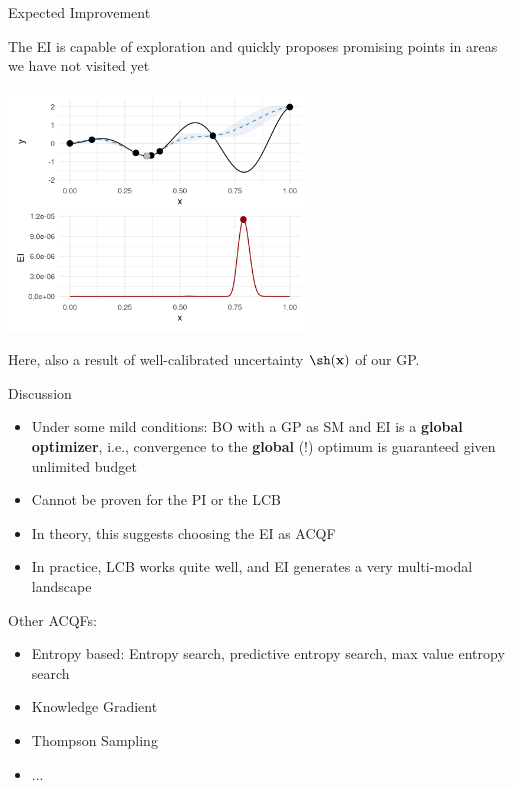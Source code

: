 \documentclass[11pt,compress,t,notes=noshow, xcolor=table]{beamer}
\begin{document}
\begin{frame}{Expected Improvement}

The EI is capable of exploration and quickly proposes promising points in areas we have not visited yet

\begin{center}
  \includegraphics[width = 0.6\textwidth]{figure_man/bayesian_loop_6.png}
\end{center}

Here, also a result of well-calibrated uncertainty $\sh(\xv)$ of our GP.

\end{frame}

\begin{frame}{Discussion}

\begin{itemize}
  \item Under some mild conditions: BO with a GP as SM and EI is a \textbf{global optimizer}, i.e., convergence to the \textbf{global} (!) optimum is guaranteed given unlimited budget
  \item Cannot be proven for the PI or the LCB
  \item In theory, this suggests choosing the EI as ACQF
  \item In practice, LCB works quite well, and EI generates a very multi-modal landscape
\end{itemize}

\vspace*{0.3cm}

Other ACQFs:
\begin{itemize}
  \item Entropy based: Entropy search, predictive entropy search, max value entropy search
  \item Knowledge Gradient
  \item Thompson Sampling
  \item ...
\end{itemize}

\end{frame}

\endlecture
\end{document}
